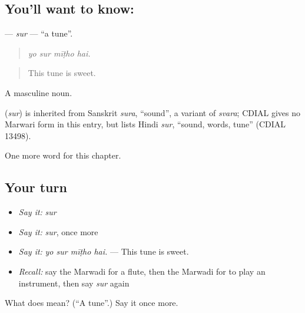 \subsection*{You'll want to know: }
\textbf{} — \emph{sur} — \textquotedblleft{}a tune\textquotedblright{}.

\begin{quote}
   
\end{quote}

\begin{quote}
\emph{yo sur mīṭho hai.}
\end{quote}

\begin{quote}
This tune is sweet.
\end{quote}

A masculine noun.

\begin{cousinweb}
\textbf{} (\emph{sur}) is inherited from Sanskrit \emph{sura}, \textquotedblleft{}sound\textquotedblright{}, a variant of \emph{svara}; CDIAL gives no Marwari form in this entry, but lists Hindi \emph{sur}, \textquotedblleft{}sound, words, tune\textquotedblright{} (CDIAL 13498).
\end{cousinweb}

\begin{grammarlens}[title={What you've built}]
One more word for this chapter.
\end{grammarlens}

\subsection*{Your turn}
\begin{itemize}
\raggedright
  \item \emph{Say it:} \emph{sur}
  \item \emph{Say it:} \emph{sur}, once more
  \item \emph{Say it:} \emph{yo sur mīṭho hai.} — This tune is sweet.
  \item \emph{Recall:} say the Marwadi for a flute, then the Marwadi for to play an instrument, then say \emph{sur} again
\end{itemize}

\begin{tcolorbox}[breakable,colback=teal!4,colframe=teal!35!black,title={Before you move on}]
What does  mean? (\textquotedblleft{}A tune\textquotedblright{}.) Say it once more.
\end{tcolorbox}
